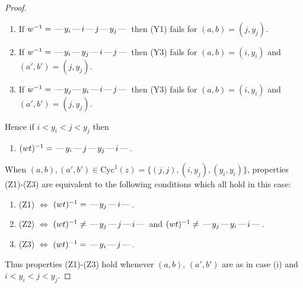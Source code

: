 \documentclass[10pt]{article}
\theoremstyle{definition}
\theoremstyle{definition}
\def\dash{\text{\hspace{0.5mm}---\hspace{0.5mm}}}
\def\Cyc{\mathrm{Cyc}}
\begin{document}
\begin{proof}
\begin{enumerate}
\item If $w^{-1} = \dash y_i\dash i\dash j\dash y_j\dash $ then (Y1) fails for $(a,b)=(j,y_j)$.
\item If $w^{-1} = \dash y_i\dash y_j\dash i\dash j\dash $ then (Y3) fails for $(a,b)=(i,y_i)$ and $(a',b')=(j,y_j)$.
\item If $w^{-1} = \dash y_j\dash y_i\dash i\dash j\dash $ then (Y3) fails for $(a,b)=(i,y_i)$ and $(a',b')=(j,y_j)$.
\end{enumerate}
Hence if $i < y_i < j < y_j$ then \begin{enumerate}\item[] $(wt)^{-1} = \dash y_i\dash j\dash y_j\dash i\dash $. \end{enumerate}
When $(a,b),(a',b')\in\Cyc^1(z)= \{(j,j),(i,y_j),(y_i,y_i)\}$,
properties (Z1)-(Z3) are equivalent to the following conditions which all hold in this case:
\begin{enumerate}
\item[](Z1) $\Leftrightarrow$ $(wt)^{-1} = \dash y_j \dash i \dash$.
\item[](Z2) $\Leftrightarrow$ $(wt)^{-1} \neq \dash y_j \dash j \dash i \dash$  and $(wt)^{-1} \neq \dash y_j \dash y_i \dash i \dash$.
\item[](Z3) $\Leftrightarrow$ $(wt)^{-1} = \dash y_i \dash j \dash$.
\end{enumerate}
Thus properties (Z1)-(Z3) hold whenever $(a,b)$, $(a',b')$ are as in case (i) and $i < y_i < j < y_j$.

\end{proof}
\end{document}
